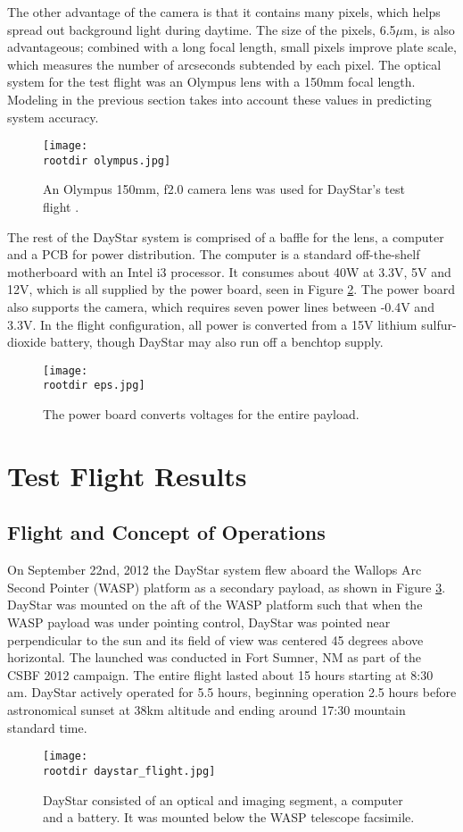 \documentclass[twocolumn,letterpaper]{IEEEAerospace2012}
\newcommand{\rootdir}{./Figures/}
\begin{document}
The other advantage of the camera is that it contains many pixels, which helps spread out background light during daytime. The size of the pixels, 6.5$\mu$m, is also advantageous; combined with a long focal length, small pixels improve plate scale, which measures the number of arcseconds subtended by each pixel. The optical system for the test flight was an Olympus lens with a 150mm focal length. Modeling in the previous section takes into account these values in predicting system accuracy.
\begin{figure}[H]
    \centering
    \texttt{[image: \\rootdir olympus.jpg]}
    \caption{An Olympus 150mm, f2.0 camera lens was used for DayStar's test flight \protect\cite{olympus}.}
    \label{fig:olympus}
\end{figure}
The rest of the DayStar system is comprised of a baffle for the lens, a computer and a PCB for power distribution. The computer is a standard off-the-shelf motherboard with an Intel i3 processor. It consumes about 40W at 3.3V, 5V and 12V, which is all supplied by the power board, seen in Figure \ref{fig:power}. The power board also supports the camera, which requires seven power lines between -0.4V and 3.3V. In the flight configuration, all power is converted from a 15V lithium sulfur-dioxide battery, though DayStar may also run off a benchtop supply.
\begin{figure}[H]
    \texttt{[image: \\rootdir eps.jpg]}
    \caption{The power board converts voltages for the entire payload.}
    \label{fig:power}
\end{figure}

\section{Test Flight Results}

\subsection{Flight and Concept of Operations}
On September 22nd, 2012 the DayStar system flew aboard the Wallops Arc Second Pointer (WASP) platform as a secondary payload, as shown in Figure \ref{fig:flight}. DayStar was mounted on the aft of the WASP platform such that when the WASP payload was under pointing control, DayStar was pointed near perpendicular to the sun and its field of view was centered 45 degrees above horizontal. The launched was conducted in Fort Sumner, NM as part of the CSBF 2012 campaign. The entire flight lasted about 15 hours starting at 8:30 am. DayStar actively operated for 5.5 hours, beginning operation 2.5 hours before astronomical sunset at 38km altitude and ending around 17:30 mountain standard time.
\begin{figure}
    \centering
    \texttt{[image: \\rootdir daystar\_flight.jpg]}
    \caption{DayStar consisted of an optical and imaging segment, a computer and a battery. It was mounted below the WASP telescope facsimile.}
    \label{fig:flight}
\end{figure}
\end{document}
